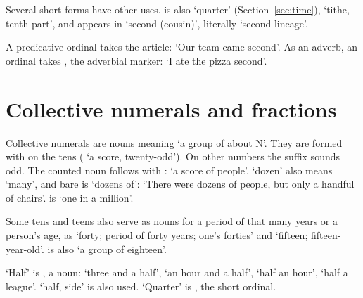 Several short forms have other uses.  is also `quarter' (Section~\ref{sec:time}),  `tithe, tenth part', and  appears in  `second (cousin)', literally `second lineage'.

A predicative ordinal takes the article:  `Our team came second'. As an adverb, an ordinal takes , the adverbial marker:  `I ate the pizza second'.

\section{Collective numerals and fractions}\label{sec:collectives}
Collective numerals are nouns meaning `a group of about N'. They are formed with  on the tens ( `a score, twenty-odd'). On other numbers the suffix sounds odd. The counted noun follows with :  `a score of people'.  `dozen' also means `many', and bare  is `dozens of':  `There were dozens of people, but only a handful of chairs'.  is `one in a million'.

Some tens and teens also serve as nouns for a period of that many years or a person's age, as  `forty; period of forty years; one's forties' and  `fifteen; fifteen-year-old'.  is also `a group of eighteen'.

`Half' is , a noun:  `three and a half',  `an hour and a half',  `half an hour',  `half a league'.  `half, side' is also used. `Quarter' is , the short ordinal.

